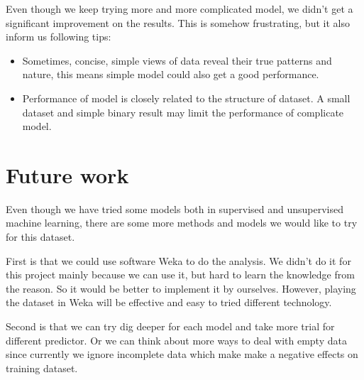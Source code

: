 \documentclass{article}
\begin{document}
Even though we keep trying more and more complicated model, we didn't get a significant improvement on the results. This is somehow frustrating, but it also inform us following tips:

\begin{itemize}
	\item Sometimes, concise, simple views of data reveal their true patterns and nature, this means simple model could also get a good performance.
	\item Performance of model is closely related to the structure of dataset. A small dataset and simple binary result may limit the performance of complicate model.
\end{itemize}

\section{Future work}
Even though we have tried some models both in supervised and unsupervised machine learning, there are some more methods and models we would like to try for this dataset. 

First is that we could use software Weka to do the analysis. We didn't do it for this project mainly because we can use it, but hard to learn the knowledge from the reason. So it would be better to implement it by ourselves. However, playing the dataset in Weka will be effective and easy to tried different technology. 

Second is that we can try dig deeper for each model and take more trial for different predictor. Or we can think about more ways to deal with empty data since currently we ignore incomplete data which make make a negative effects on training dataset.
\end{document}
